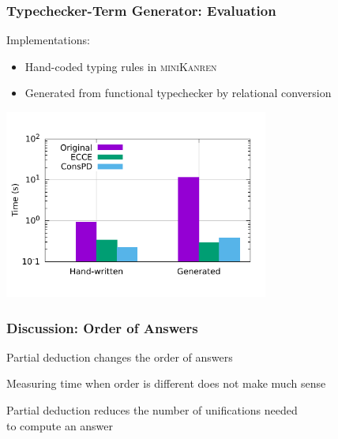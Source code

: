\documentclass[xcolor=table]{beamer}
\newcommand{\mk}{\textsc{miniKanren}\xspace}
\begin{document}
\begin{frame}[fragile]
  \frametitle{Typechecker-Term Generator: Evaluation}

Implementations:
\begin{itemize}
  \item Hand-coded typing rules in \mk
  \item Generated from functional typechecker by relational conversion
\end{itemize}

  \begin{center}
    \includegraphics[width=0.65\textwidth]{pictures/type/ltypelog.pdf}
  \end{center}
\end{frame}

\begin{frame}[fragile]
  \frametitle{Discussion: Order of Answers}
\begin{center}
  Partial deduction changes the order of answers
\end{center}

\begin{center}
  Measuring time when order is different does not make much sense
\end{center}

\begin{center}
  Partial deduction reduces the number of unifications needed \\ to compute an answer
\end{center}

\end{frame}
\end{document}
